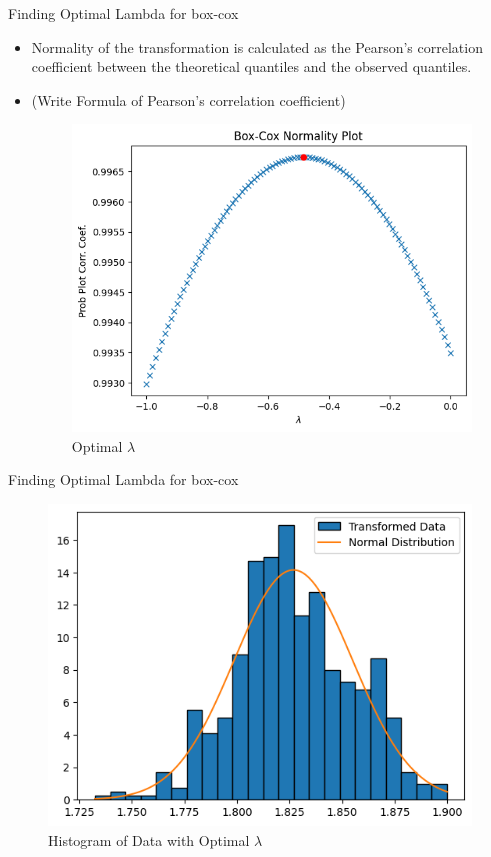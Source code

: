 \begin{frame}{Finding Optimal Lambda for box-cox}
\begin{itemize}
    \item Normality of the transformation is calculated as the Pearson's correlation coefficient between the theoretical quantiles and the observed quantiles.
    \item (Write Formula of Pearson's correlation coefficient)
    \vspace{0.25in}
    \begin{figure}
        \centering
        \includegraphics[width=0.65\linewidth]{Project1/Report/images/normality.png}
        \caption{Optimal $\lambda$}
        \label{fig:enter-label}
    \end{figure}
\end{itemize}
  
\end{frame}

\begin{frame}{Finding Optimal Lambda for box-cox}
\begin{itemize}
    \begin{figure}
        \centering
        \includegraphics[width=0.8\linewidth]{Project1/Report/images/optimal-hist.png}
        \caption{Histogram of Data with Optimal $\lambda$}
        \label{fig:enter-label}
    \end{figure}
\end{itemize}
  
\end{frame}


